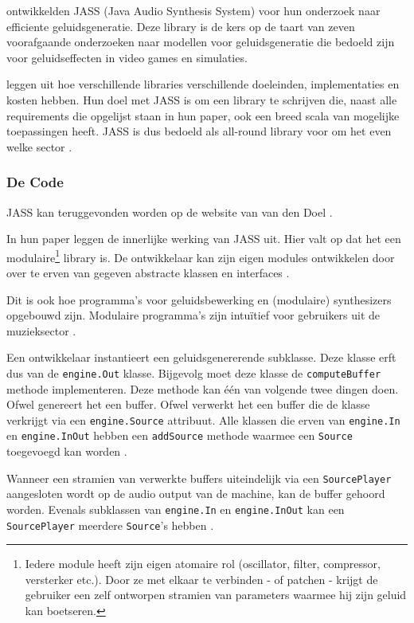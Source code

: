 \textcite{jass} ontwikkelden JASS (Java Audio Synthesis System) voor hun onderzoek naar efficiente geluidsgeneratie. Deze library is de kers op de taart van zeven voorafgaande onderzoeken naar modellen voor geluidsgeneratie die bedoeld zijn voor geluidseffecten in video games en simulaties. 

\textcite{jass} leggen uit hoe verschillende libraries verschillende doeleinden, implementaties en kosten hebben. Hun doel met JASS is om een library te schrijven die, naast alle requirements die opgelijst staan in hun paper, ook een breed scala van mogelijke toepassingen heeft. JASS is dus bedoeld als all-round library voor om het even welke sector \autocite{jass}.

\subsubsection*{De Code}
\label{sec:jass_code}

JASS kan teruggevonden worden op de website van van den Doel \autocite{jasscode}.

In hun paper leggen \textcite{jass} de innerlijke werking van JASS uit. Hier valt op dat het een modulaire\footnote{Iedere module heeft zijn eigen atomaire rol (oscillator, filter, compressor, versterker etc.). Door ze met elkaar te verbinden - of patchen - krijgt de gebruiker een zelf ontworpen stramien van parameters waarmee hij zijn geluid kan boetseren.} library is. De ontwikkelaar kan zijn eigen modules ontwikkelen door over te erven van gegeven abstracte klassen en interfaces  \autocite{jass}. 

Dit is ook hoe programma's voor geluidsbewerking en (modulaire) synthesizers opgebouwd zijn. Modulaire programma's zijn intuïtief voor gebruikers uit de muzieksector \autocite{bartvincent}.

Een ontwikkelaar instantieert een geluidsgenererende subklasse. Deze klasse erft dus van de \verb+engine.Out+ klasse. Bijgevolg moet deze klasse de \verb+computeBuffer+ methode implementeren. Deze methode kan één van volgende twee dingen doen. Ofwel genereert het een buffer. Ofwel verwerkt het een buffer die de klasse verkrijgt via een \verb+engine.Source+ attribuut. Alle klassen die erven van \verb+engine.In+ en \verb+engine.InOut+ hebben een \verb+addSource+ methode waarmee een \verb+Source+ toegevoegd kan worden \autocite{jass}.

Wanneer een stramien van verwerkte buffers uiteindelijk via een \verb+SourcePlayer+ aangesloten wordt op de audio output van de machine, kan de buffer gehoord worden. Evenals subklassen van \verb+engine.In+ en \verb+engine.InOut+ kan een \verb+SourcePlayer+ meerdere \verb+Source+'s hebben \autocite{jass}.

